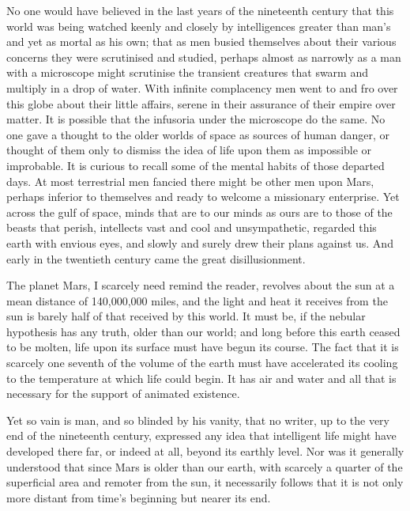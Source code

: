 No one would have believed in the last years of the nineteenth
century that this world was being watched keenly and closely by
intelligences greater than man's and yet as mortal as his own; that
as men busied themselves about their various concerns they were
scrutinised and studied, perhaps almost as narrowly as a man with a
microscope might scrutinise the transient creatures that swarm and
multiply in a drop of water. With infinite complacency men went to
and fro over this globe about their little affairs, serene in their
assurance of their empire over matter. It is possible that the
infusoria under the microscope do the same. No one gave a thought
to the older worlds of space as sources of human danger, or thought
of them only to dismiss the idea of life upon them as impossible or
improbable. It is curious to recall some of the mental habits of
those departed days. At most terrestrial men fancied there might be
other men upon Mars, perhaps inferior to themselves and ready to
welcome a missionary enterprise. Yet across the gulf of space,
minds that are to our minds as ours are to those of the beasts that
perish, intellects vast and cool and unsympathetic, regarded this
earth with envious eyes, and slowly and surely drew their plans
against us. And early in the twentieth century came the great
disillusionment.

The planet Mars, I scarcely need remind the reader, revolves about
the sun at a mean distance of 140,000,000 miles, and the light and
heat it receives from the sun is barely half of that received by
this world. It must be, if the nebular hypothesis has any truth,
older than our world; and long before this earth ceased to be
molten, life upon its surface must have begun its course. The fact
that it is scarcely one seventh of the volume of the earth must
have accelerated its cooling to the temperature at which life could
begin. It has air and water and all that is necessary for the
support of animated existence.

Yet so vain is man, and so blinded by his vanity, that no writer,
up to the very end of the nineteenth century, expressed any idea
that intelligent life might have developed there far, or indeed at
all, beyond its earthly level. Nor was it generally understood that
since Mars is older than our earth, with scarcely a quarter of the
superficial area and remoter from the sun, it necessarily follows
that it is not only more distant from time's beginning but nearer
its end.

